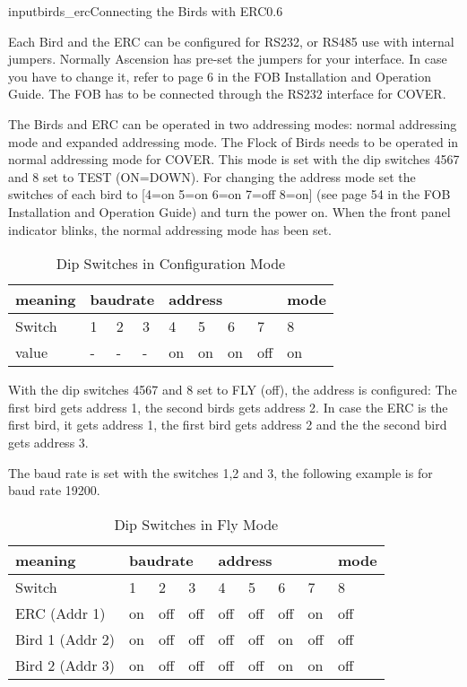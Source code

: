 \begin{covimg}{input}{birds_erc}{Connecting the Birds with ERC}{0.6}\end{covimg}

Each Bird and the ERC can be configured for RS232, or RS485 use with internal
jumpers. Normally Ascension has pre-set the jumpers for your interface. In
case you have to change it, refer to page 6 in the FOB Installation and Operation Guide.
The FOB has to be connected through the RS232 interface for COVER.

The Birds and ERC can be operated in two addressing modes:
normal addressing mode and expanded addressing mode. The Flock of Birds
needs to be operated in normal addressing mode for COVER. This mode is set
with the dip switches 4567 and 8 set to TEST (ON=DOWN). 
For changing the address mode set the switches
of each bird to [4=on 5=on 6=on 7=off 8=on] (see page 54 in the FOB Installation 
and Operation Guide) and turn the power on. When the front panel indicator blinks,
the normal addressing mode has been set.
\begin{table}[!htb]
\begin{center}
\begin{tabular}{|l|l|l|l|l|l|l|l|l|}

\hline
meaning & \multicolumn{3}{|l|}{baudrate} &\multicolumn{4}{|l|}{address}&mode\\
\hline
Switch&1&2&3&4&5&6&7&8\\
\hline
value&-&-&-&on&on&on&off& on\\
\hline
\end{tabular}
\end{center}
\caption{Dip Switches in Configuration Mode}

\end{table}

With the dip switches 4567 and 8 set to FLY (off), the address is configured:
The first bird gets address 1,
the second birds gets address 2.
In case the ERC is the first bird, it gets address 1, the first bird gets address 2 and
the the second bird gets address 3.

The baud rate is set with the switches 1,2 and 3, the following example is 
for baud rate 19200.

\begin{table}[!htb]
\begin{center}
\begin{tabular}{|l|l|l|l|l|l|l|l|l|}

\hline
meaning & \multicolumn{3}{|l|}{baudrate} &\multicolumn{4}{|l|}{address}&mode\\
\hline
Switch&1&2&3&4&5&6&7&8\\
\hline
ERC (Addr 1)&on&off&off&off&off&off&on&off\\
\hline
Bird 1 (Addr 2)&on&off&off&off&off&on&off& off\\
\hline
Bird 2 (Addr 3)&on&off&off&off&off&on&on& off\\
\hline
\end{tabular}
\end{center}
\caption{Dip Switches in Fly Mode}

\end{table}





